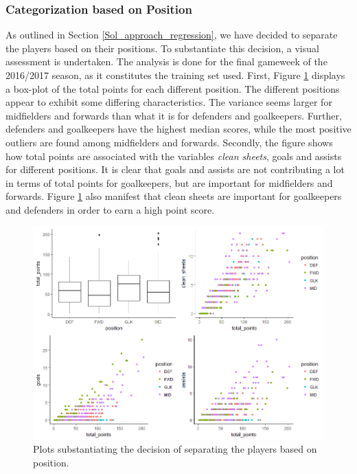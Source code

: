 \subsubsection{Categorization based on Position}

As outlined in Section \ref{Sol_approach_regression}, we have decided to separate the players based on their positions. To substantiate this decision, a visual assessment is undertaken. The analysis is done for the final gameweek of the 2016/2017 season, as it constitutes the training set used. First, Figure \ref{fig:cluster_plots} displays a box-plot of the total points for each different position. The different positions appear to exhibit some differing characteristics. The variance seems larger for midfielders and forwards than what it is for defenders and goalkeepers. Further, defenders and goalkeepers have the highest median scores, while the most positive outliers are found among midfielders and forwards. Secondly, the figure shows how total points are associated with the variables \textit{clean sheets}, goals and assists for different positions. It is clear that goals and assists are not contributing a lot in terms of total points for goalkeepers, but are important for midfielders and forwards. Figure \ref{fig:cluster_plots} also manifest that clean sheets are important for goalkeepers and defenders in order to earn a high point score.

\begin{figure}[H]
    \centering
    \includegraphics[scale=0.55]{fig/chapter_6/cluster_plots.png}
    \caption{Plots substantiating the decision of separating the players based on position.}
\label{fig:cluster_plots}    
\end{figure}


